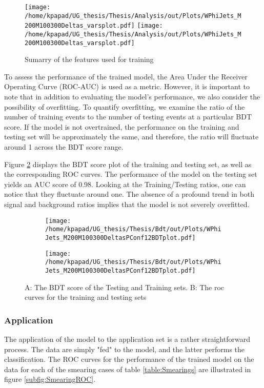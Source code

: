 \begin{figure}[h!]
\centering
\texttt{[image: /home/kpapad/UG\_thesis/Thesis/Analysis/out/Plots/WPhiJets\_M200M100300Deltas\_varsplot.pdf]}
\texttt{[image: /home/kpapad/UG\_thesis/Thesis/Analysis/out/Plots/WPhiJets\_M200M100300Deltas\_varsplot.pdf]}
\caption{Sumarry of the features used for training }
\label{fig:TrainFeaturesPlot}
\end{figure}

To assess the performance of the trained model, the Area Under the Receiver Operating Curve (ROC-AUC) is used as a metric. However, it is important to note that in addition to evaluating the model's performance, we also consider the possibility of overfitting. To quantify overfitting, we examine the ratio of the number of training events to the number of testing events at a particular BDT score. If the model is not overtrained, the performance on the training and testing set will be approximately the same, and therefore, the ratio will fluctuate around 1 across the BDT score range.

Figure \ref{fig:BDTplot} displays the BDT score plot of the training and testing set, as well as the corresponding ROC curves. The performance of the model on the testing set yields an AUC score of 0.98. Looking at the Training/Testing ratios, one can notice that they fluctuate around one. The absence of a profound trend in both signal and background ratios implies that the model is not severely overfitted.
\begin{figure}[h!]
\centering
\begin{subfigure}{0.49\textwidth}
\centering
\texttt{[image: /home/kpapad/UG\_thesis/Thesis/Bdt/out/Plots/WPhiJets\_M200M100300DeltasPConf12BDTplot.pdf]}
\caption{}
\end{subfigure}
\begin{subfigure}{0.49\textwidth}
\centering
\texttt{[image: /home/kpapad/UG\_thesis/Thesis/Bdt/out/Plots/WPhiJets\_M200M100300DeltasPConf12BDTplot.pdf]}
\caption{}
\end{subfigure}
\caption{A: The BDT score of the Testing and Training sets. B: The roc curves for the training and testing sets}
\label{fig:BDTplot}
\end{figure}

\subsubsection{Application}
\label{sec:orgc469879}
The application of the model to the application set is a rather straightforward process. The data are simply "fed" to the model, and the latter performs the classification. The ROC curves for the performance of the trained model on the data for each of the smearing cases of table \ref{table:Smearings} are illustrated in figure \ref{subfig:SmearingROC}.

